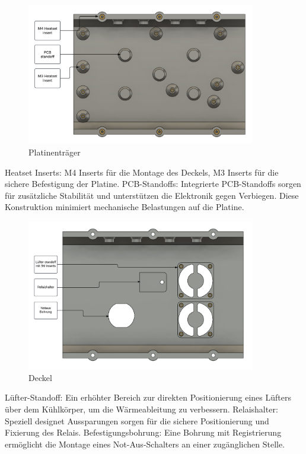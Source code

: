\documentclass[paper=a4,11pt]{scrreprt}
\begin{document}
\begin{figure}[ht]
\begin{center}
\includegraphics[width=10cm]{Bilder/botA.PNG}
\caption{Platinenträger}
\label{pholder}
\end{center}
\end{figure}
Heatset Inserts: M4 Inserts für die Montage des Deckels, M3 Inserts für die sichere Befestigung der Platine.
PCB-Standoffs: Integrierte PCB-Standoffs sorgen für zusätzliche Stabilität und unterstützen die Elektronik gegen Verbiegen. Diese Konstruktion minimiert mechanische Belastungen auf die Platine.
\newpage
\begin{figure}[ht]
\begin{center}
\includegraphics[width=10cm]{Bilder/Deckel.PNG}
\caption{Deckel}
\label{Deckel}
\end{center}
\end{figure}
Lüfter-Standoff: Ein erhöhter Bereich zur direkten Positionierung eines Lüfters über dem Kühlkörper, um die Wärmeableitung zu verbessern.
Relaishalter: Speziell designet Aussparungen sorgen für die sichere Positionierung und Fixierung des Relais.
Befestigungsbohrung: Eine Bohrung mit Registrierung ermöglicht die Montage eines Not-Aus-Schalters an einer zugänglichen Stelle.\\
\\
\end{document}
